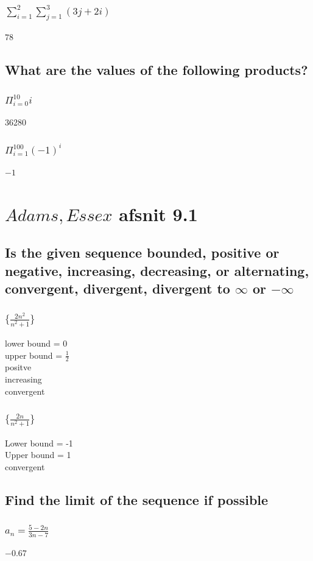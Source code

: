 \documentclass[12pt, a4paper]{report}
\begin{document}
				\subsubsection{$\sum\limits_{i=1}^2\sum\limits_{j=1}^3(3j+2i)$}	
					$78$
				\setcounter{subsection}{44}
				\subsection{What are the values of the following products?}
					\subsubsection{$\Pi_{i=0}^{10}i$}
						36280
					\setcounter{subsubsection}{2}
					\subsubsection{$\Pi_{i=1}^{100}(-1)^i$}
						$-1$
			\section{$Adams, Essex$ afsnit 9.1}
			\subsection{Is the given sequence bounded, positive or negative, increasing, decreasing, or alternating, convergent, divergent, divergent to $\infty$ or $-\infty$}
					\subsubsection{$\{\frac{2n^2}{n^2+1}\}$}
						lower bound = 0\\
						upper bound = $\frac{1}{2}$\\
						positve\\
						increasing\\
						convergent
					\subsubsection{$\{\frac{2n}{n^2+1}\}$}
						Lower bound = -1\\
						Upper bound = 1\\
						convergent
				\subsection{Find the limit of the sequence if possible}
					\subsubsection{$a_n=\frac{5-2n}{3n-7}$}
						$-0.67$
\end{document}
